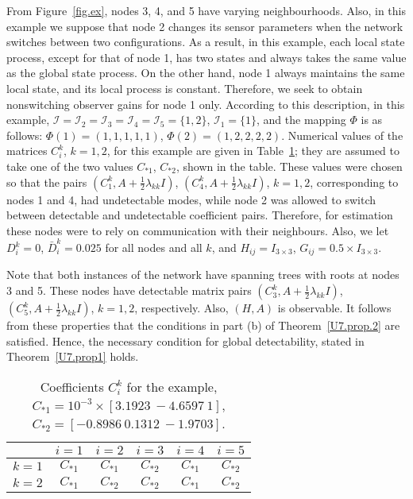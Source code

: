 \documentclass[a4paper,twocolumn]{autart}
\begin{document}
From Figure~\ref{fig.ex}, nodes 3, 4, and
5 have varying neighbourhoods. Also, in this example we suppose that node 2
changes its sensor parameters when the network switches between two
configurations. As a result, in this example, each local state process,
except for that of node 1, has two states and always takes the same value as
the global state process. On the other hand, node 1 always maintains the same
local state, and its local process is constant. Therefore,    
we seek to obtain nonswitching observer gains for node 1 only. According to
this description, in this example,
$\mathcal{I}=\mathcal{I}_2=\mathcal{I}_3=\mathcal{I}_4=\mathcal{I}_5=\{1,2\}$,
$\mathcal{I}_1=\{1\}$, and the mapping $\Phi$ is as follows:
$\Phi(1)=(1,1,1,1,1)$, $\Phi(2)=(1,2,2,2,2)$. 
Numerical values of the matrices $C_i^k$, $k=1,2$, for this example
are given in Table~\ref{TableC}; they are assumed to take one of the two
values $C_{*1}$, $C_{*2}$, shown in the table. These values were chosen so
that the pairs $(C_1^k, A+\frac{1}{2}\lambda_{kk}I)$,  $(C_4^k,
A+\frac{1}{2}\lambda_{kk}I)$, $k=1,2$, corresponding to nodes 1 and 4, had
undetectable modes, while node 2 was allowed to switch between detectable and
undetectable coefficient pairs. Therefore, for estimation these nodes were to
rely on communication with their neighbours.  
Also,    
we let $D_i^k=0$, $\bar D_i^k=0.025$ for all nodes and all $k$, and
$H_{ij}=I_{3\times 3}$, $G_{ij}=0.5\times I_{3\times 3}$. 

Note that both instances of the network have 
spanning trees with roots at nodes 3 and 5. These
nodes have detectable matrix pairs $(C_3^k, A+\frac{1}{2}\lambda_{kk}I)$,
$(C_5^k, A+\frac{1}{2}\lambda_{kk}I)$, $k=1,2$, respectively. Also,
$(H,A)$ is observable. It follows from these
properties that the conditions in part (b)
of Theorem~\ref{U7.prop.2} are satisfied. Hence, the
necessary condition for 
 global detectability, stated in Theorem~\ref{U7.prop1} holds.
\begin{table}
  \caption{Coefficients $C_i^k$ for the example, $C_{*1}=10^{-3}\times [3.1923~
-4.6597~    1]$, $C_{*2}=[-0.8986~    0.1312~ -1.9703]$.} \label{TableC}
  \centering
  \begin{tabular}{|c|c|c|c|c|c|}
\hline 
       & $i=1$ & $i=2$ & $i=3$ & $i=4$ & $i=5$  \\ \hline
$k=1$  & $C_{*1}$ & $C_{*1}$ & $C_{*2}$ & $C_{*1}$ & $C_{*2}$ \\
$k=2$  & $C_{*1}$ & $C_{*2}$ & $C_{*2}$ & $C_{*1}$ & $C_{*2}$ \\
\hline
  \end{tabular}
\end{table}
\end{document}

